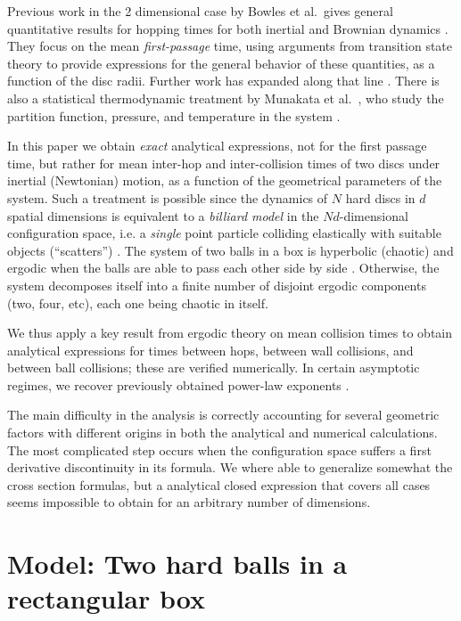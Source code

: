 \documentclass[superscriptaddress,pre,reprint,showpacs,twocolumn]{revtex4-1}
\newcommand{\etal}{et al.\ }
\begin{document}
 
Previous work in the 2 dimensional case
by Bowles \etal gives general quantitative results for hopping times 
for both inertial and Brownian dynamics \cite{Bowles04}. They focus
on the mean \emph{first-passage} time, using arguments from transition state theory 
to provide expressions for the general behavior of these quantities, as a function of the
disc radii. %
Further work has expanded along that line  \cite{Suh05, Ball09}.
There is also a statistical thermodynamic treatment by Munakata \etal, 
who study the partition function, pressure,
and temperature in the system \cite{Munakata02, Munakata06}. 


In this paper we obtain \emph{exact} analytical expressions, not for the first passage time,
but rather for mean inter-hop and inter-collision times of two discs under 
inertial (Newtonian) motion, as a function of the geometrical parameters of the system. Such a treatment is possible
 since the dynamics of $N$ hard discs in $d$ spatial dimensions
 is equivalent to a \emph{billiard model} in the $Nd$-dimensional configuration space, i.e. a \emph{single} point particle colliding elastically 
with suitable objects (``scatters'') \cite{SzaszBook00}. 
The system of two balls in a box is hyperbolic (chaotic) and ergodic when the balls are able to pass each other side by side \cite{Sim99}.
Otherwise, the system decomposes itself into
a finite number of disjoint ergodic components (two, four, etc),
each one being chaotic in itself.

We thus apply a key result from ergodic theory on mean collision times \cite{Chernov97} to obtain analytical expressions 
for times between hops, between wall collisions, and between ball collisions; these are verified numerically. 
In certain asymptotic regimes, we recover previously obtained power-law exponents \cite{Bowles04}.

The main difficulty in the analysis is correctly accounting for several geometric factors with different origins in both the
analytical and numerical calculations. The most complicated step occurs when the configuration space
suffers a first derivative discontinuity in its formula. We where able to generalize somewhat
the cross section formulas, but a analytical closed expression that covers all cases seems
impossible to obtain for an arbitrary number of dimensions. 



\section{Model: Two hard balls in a rectangular box}
\end{document}
